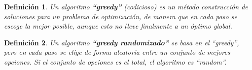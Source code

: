 \documentclass[12pt,a4paper]{book}
\newtheorem{defi}{Definición}[section]
\begin{document}
\begin{defi}
Un algoritmo \textbf{``greedy''} (codicioso) es un método construcción de soluciones para un problema de optimización,
de manera que en cada paso se escoge la mejor posible, aunque esto no lleve finalmente a un óptimo global.
\end{defi}

\bigskip

\begin{defi}
Un algoritmo \textbf{``greedy randomizado''} se basa en el ``greedy'', pero en cada paso se elige de forma aleatoria entre un conjunto de mejores opciones.
Si el conjunto de opciones es el total, el algoritmo es ``random''.
\end{defi}

\nocite{*}


\end{document}
